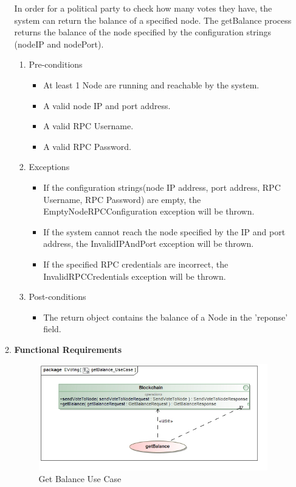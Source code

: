 \begin{enumerate}
\begin{enumerate}
			In order for a political party to check how many votes they have, the system can return the balance of a specified node. The getBalance process returns the balance of the node specified by the configuration strings (nodeIP and nodePort).
			\newline
			
			\begin{enumerate}
				\item Pre-conditions
				\begin{itemize}
						\item At least 1 Node are running and reachable by the system.
						\item A valid node IP and port address.
						\item A valid RPC Username.
						\item A valid RPC Password.
				\end{itemize}
				
				\item Exceptions
				\begin{itemize}
						\item If the configuration strings(node IP address, port address, RPC Username, RPC Password) are empty, the EmptyNodeRPCConfiguration exception will be thrown.
						\item If the system cannot reach the node specified by the IP and port address, the InvalidIPAndPort exception will be thrown.
						\item If the specified RPC credentials are incorrect, the InvalidRPCCredentials exception will be thrown.
				\end{itemize}
				
				\item Post-conditions
				\begin{itemize}
					\item  The return object contains the balance of a Node in the 'reponse' field.
				\end{itemize}
			\end{enumerate}
			
			\newpage
			
			\item \textbf{Functional Requirements}
			\begin{figure}[H]
				\centering
				\includegraphics[width=0.75\linewidth]{../Images/Blockchain/UseCase/getBalance_UseCase.jpg}
				\caption{Get Balance Use Case}
			\end{figure}
			

\end{enumerate}
\end{enumerate}
